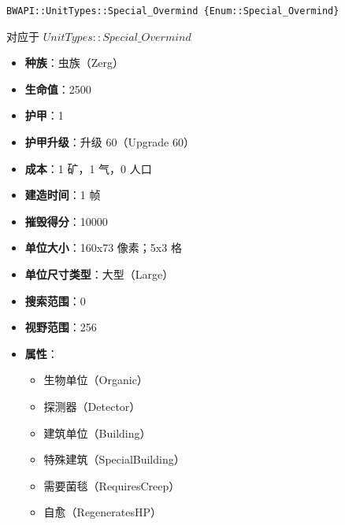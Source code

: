 \begin{tcolorbox}[colback=white, colframe=black!60!white, title=Special\_Overmind(), arc=0mm]
    \begin{verbatim}
BWAPI::UnitTypes::Special_Overmind {Enum::Special_Overmind}
    \end{verbatim}
    对应于  $UnitTypes::Special\_Overmind$ 
    \begin{itemize}
        \item \textbf{种族}：虫族（Zerg）
        \item \textbf{生命值}：2500
        \item \textbf{护甲}：1
        \item \textbf{护甲升级}：升级 60（Upgrade 60）
        \item \textbf{成本}：1 矿，1 气，0 人口
        \item \textbf{建造时间}：1 帧
        \item \textbf{摧毁得分}：10000
        \item \textbf{单位大小}：160x73 像素；5x3 格
        \item \textbf{单位尺寸类型}：大型（Large）
        \item \textbf{搜索范围}：0
        \item \textbf{视野范围}：256
        \item \textbf{属性}：
            \begin{itemize}
                \item 生物单位（Organic）
                \item 探测器（Detector）
                \item 建筑单位（Building）
                \item 特殊建筑（SpecialBuilding）
                \item 需要菌毯（RequiresCreep）
                \item 自愈（RegeneratesHP）
            \end{itemize}
    \end{itemize}
\end{tcolorbox}

